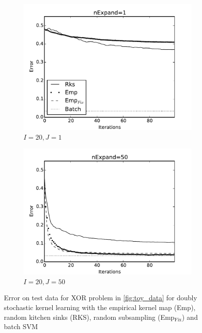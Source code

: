 \documentclass{article} %
\begin{document}
\begin{figure}[!ht]
\begin{subfigure}[b]{0.235\textwidth}
        \includegraphics[width=\textwidth]{imgs/rks_emp_comparison-pred-20-expand-1}
        \caption{$I=20, J=1$}
        \label{fig:pred_20_expand_1}
    \end{subfigure}
    \hfill
    \begin{subfigure}[b]{0.235\textwidth}
        \includegraphics[width=\textwidth]{imgs/rks_emp_comparison-pred-20-expand-50}
        \caption{$I=20, J=50$}
        \label{fig:pred_20_expand_50}
    \end{subfigure}
    \caption{Error on test data for XOR problem in \autoref{fig:toy_data} for doubly stochastic kernel learning with the empirical kernel map (Emp), random kitchen sinks (RKS), random subsampling (Emp$_{\text{Fix}}$) and batch SVM}
    \label{fig:toydata_comparisons}
\end{figure}
\end{document}
